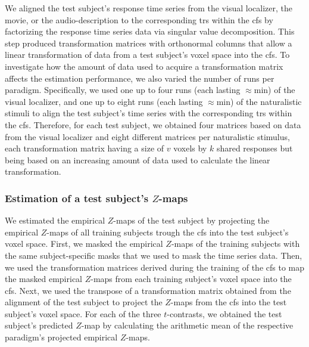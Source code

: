 %
We aligned the test subject's response time series from the visual localizer,
the movie, or the audio-description to the corresponding \acp{tr} within the
\ac{cfs} by factorizing the response time series data via singular value
decomposition.
%
This step produced transformation matrices with orthonormal columns that allow a
linear transformation of data from a test subject's voxel space into the
\ac{cfs}.
%
To investigate how the amount of data used to acquire a transformation matrix
affects the estimation performance, we also varied the number of runs per
paradigm.
%
Specifically, we used
%
one up to four runs (each lasting $\approx$\unit[5]{min}) of the visual
localizer, and
%
one up to eight runs (each lasting $\approx$\unit[15]{min}) of the naturalistic
stimuli
%
to align the test subject's time series with the corresponding \acp{tr} within
the \ac{cfs}.
%
Therefore, for each test subject, we obtained four matrices based on data from
the visual localizer and eight different matrices per naturalistic stimulus,
each transformation matrix having a size of $v$ voxels by $k$ shared responses
but being based on an increasing amount of data used to calculate the linear
transformation.


\subsubsection{Estimation of a test subject's $Z$-maps}

We estimated the empirical $Z$-maps of the test subject by projecting the
empirical $Z$-maps of all training subjects trough the \ac{cfs} into the test
subject's voxel space.
First, we masked the empirical $Z$-maps of the training subjects with the same
subject-specific masks that we used to mask the time series data.
%
Then, we used the transformation matrices derived during the training of the
\ac{cfs} to map the masked empirical $Z$-maps from each training subject's voxel
space into the \ac{cfs}.
%
Next, we used the transpose of a transformation matrix obtained from the
alignment of the test subject to project the $Z$-maps from the \ac{cfs} into the
test subject's voxel space.
For each of the three $t$-contrasts, we obtained the test subject's predicted
$Z$-map by calculating the arithmetic mean of the respective paradigm's
projected empirical $Z$-maps.


